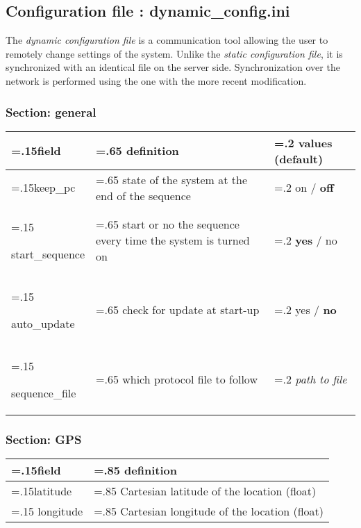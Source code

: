 

\subsection{Configuration file : dynamic\_config.ini}
\label{annex:dynamicconfig}
The \emph{dynamic configuration file} is a communication tool allowing the
user to remotely change settings of the system. Unlike the \emph{static
configuration file}, it is synchronized with an identical file on the server side.
Synchronization over the network is performed using the one with the more recent 
modification.

\subsubsection{Section: general}
\begin{tabularx}{\textwidth} {
        | >{\hsize=.15\hsize}X
        | >{\hsize=.65\hsize}X
		| >{\hsize=.2\hsize}X | }
	\hline
	\textbf{field} & \textbf{definition} & values (\textbf{default}) \\
	\hline
	\hline
	keep\_pc & state of the system at the end of the sequence & on / \textbf{off} 
	\\ \hline

	start\_sequence & start or no the sequence every time the system is turned 
	on & \textbf{yes} / no 
	\\ \hline

	auto\_update & check for update at start-up & yes / \textbf{no}
	\\ \hline

	sequence\_file 	& which protocol file to follow & \textit{path to file}
	\\ \hline
\end{tabularx}

\subsubsection{Section: GPS}
\begin{tabularx}{\textwidth} {
        | >{\hsize=.15\hsize}X
		| >{\hsize=.85\hsize}X| }
	\hline
	\textbf{field} & \textbf{definition} \\
	\hline
	\hline
	latitude  &  Cartesian latitude of the location (float)
	\\ \hline
	longitude & Cartesian longitude of the location (float)
	\\ \hline
\end{tabularx}


